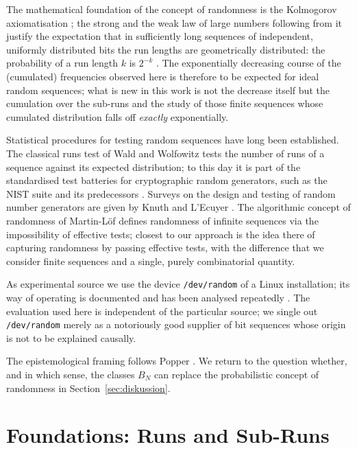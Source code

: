 \documentclass[11pt,a4paper]{scrartcl}
\theoremstyle{plain}
\theoremstyle{definition}
\theoremstyle{remark}
\begin{document}
The mathematical foundation of the concept of randomness is the
Kolmogorov axiomatisation \cite{kolmogoroff1933}; the strong and the
weak law of large numbers following from it justify the expectation
that in sufficiently long sequences of independent, uniformly
distributed bits the run lengths are geometrically distributed: the
probability of a run length $k$ is $2^{-k}$ \cite[and the exercises on
runs therein]{feller1968}. The exponentially decreasing course of the
(cumulated) frequencies observed here is therefore to be expected for
ideal random sequences; what is new in this work is not the decrease
itself but the cumulation over the sub-runs and the study of those
finite sequences whose cumulated distribution falls off
\emph{exactly} exponentially.

Statistical procedures for testing random sequences have long been
established. The classical runs test of Wald and Wolfowitz
\cite{waldwolfowitz1940} tests the number of runs of a sequence against
its expected distribution; to this day it is part of the standardised
test batteries for cryptographic random generators, such as the NIST
suite \cite{rukhin2010nist} and its predecessors
\cite{knuth1997,marsaglia1996}. Surveys on the design and testing of
random number generators are given by Knuth \cite{knuth1997} and
L'Ecuyer \cite{lecuyer1994}. The algorithmic concept of randomness of
Martin-Löf \cite{martinloef1966} defines randomness of infinite
sequences via the impossibility of effective tests; closest to our
approach is the idea there of capturing randomness by passing
effective tests, with the difference that we consider finite
sequences and a single, purely combinatorial quantity.

As experimental source we use the device \texttt{/dev/random} of a
Linux installation; its way of operating is documented and has been
analysed repeatedly \cite{gutterman2004}. The evaluation used here is
independent of the particular source; we single out
\texttt{/dev/random} merely as a notoriously good supplier of bit
sequences whose origin is not to be explained causally.

The epistemological framing follows Popper \cite{popper1935}. We
return to the question whether, and in which sense, the classes $B_N$
can replace the probabilistic concept of randomness in
Section~\ref{sec:diskussion}.

\section{Foundations: Runs and Sub-Runs}\label{sec:grundlagen}
\end{document}
